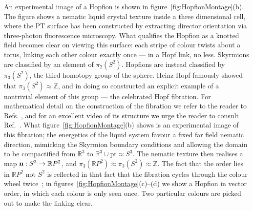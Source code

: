 An experimental image of a Hopfion is shown in figure~\ref{fig:HopfionMontage}(b)\citep{ChenThesis,Chen2013}. The figure shows a nematic liquid crystal texture inside a three dimensional cell, where the PT surface has been constructed by extracting director orientation via three-photon fluorescence microscopy. What qualifies the Hopfion as a knotted field becomes clear on viewing this surface: each stripe of colour twists about a torus, linking each other colour exactly once --- in a Hopf link, no less. Skyrmions are classified by an element of $\pi_2(S^2)$. Hopfions are instead classified by $\pi_3(S^2)$, the third homotopy group of the sphere. Heinz Hopf famously showed that $\pi_3(S^2) \approx \mathbb{Z}$, and in doing so constructed an explicit example of a nontrivial element of this group --- the celebrated Hopf fibration. For mathematical detail on the construction of the fibration we refer to the reader to Refs. \citep{BottTuBook,AlexanderBook}, and for an excellent video of its structure we urge the reader to consult Ref.~\citep{Johnson2011}. What figure~\ref{fig:HopfionMontage}(b) shows is an experimental image of this fibration; the energetics of the liquid system favour a fixed far field nematic direction, mimicking the Skyrmion boundary conditions and allowing the domain to be compactified  from $\mathbb{R}^3$ to $\mathbb{R}^3 \cup \textrm{pt} \approx {S}^3$. The nematic texture then realises a map ${\bf n}: S^3 \rightarrow \mathbb{R}P^2$, and $\pi_3(\mathbb{R}P^2) \approx \pi_3(S^2) \approx \mathbb{Z}$. The fact that the order lies in $\mathbb{R}P^2$ not $S^2$ is reflected in that fact that the fibration cycles through the colour wheel twice~\citep{Chen2013,Ackerman2017}; in figures~\ref{fig:HopfionMontage}(c)--(d) we show a Hopfion in vector order, in which each colour is only seen once. Two particular colours are picked out to make the linking clear.
